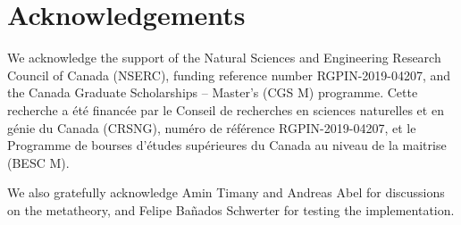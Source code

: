 \section*{Acknowledgements}

We acknowledge the support of the Natural Sciences and Engineering Research Council of Canada (NSERC), funding reference number RGPIN-2019-04207,
and the Canada Graduate Scholarships -- Master’s (CGS M) programme.
Cette recherche a \'et\'e financ\'ee par le Conseil de recherches en sciences naturelles et en g\'enie du Canada (CRSNG), num\'ero de r\'ef\'erence RGPIN-2019-04207,
et le Programme de bourses d’\'etudes sup\'erieures du Canada au niveau de la maitrise (BESC M).

We also gratefully acknowledge Amin Timany and Andreas Abel for discussions on the metatheory,
and Felipe Ba\~nados Schwerter for testing the implementation.
